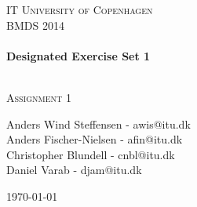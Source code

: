 


%


\begin{center}
\thispagestyle{empty}


\textsc{\LARGE IT University of Copenhagen}\\[1.5cm]

\textsc{\Large BMDS 2014 }\\[0.5cm]

\HRule \\[0.4cm]
{ \huge \bfseries Designated Exercise Set 1\\ [0.4cm]
    }

\HRule \\[1cm]

\textsc{\Large Assignment 1 }\\[1.5cm]

\begin{minipage}{1\textwidth}
\begin{center} \large
Anders Wind Steffensen - awis@itu.dk\\
Anders Fischer-Nielsen - afin@itu.dk\\
Christopher Blundell - cnbl@itu.dk\\
Daniel Varab - djam@itu.dk\\
\end{center}
\end{minipage}


\vfill

{\large \today}

\end{center}

\frontmatter%

%
%



\newpage

\mainmatter%





